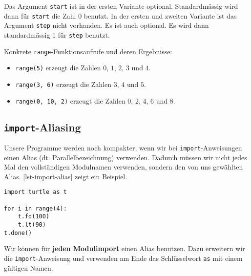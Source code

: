\vspace{-0.25cm}

\begin{important}
Das Argument \lstinline{start} ist in der ersten Variante optional. Standardmässig wird dann für \lstinline{start} die Zahl \num{0} benutzt. In der ersten und zweiten Variante ist das Argument \lstinline{step} nicht vorhanden. Es ist auch optional. Es wird dann standardmässig \num{1} für \lstinline{step} benutzt.
\end{important}

\begin{example}
Konkrete \texttt{range}-Funktionsaufrufe und deren Ergebnisse:
\begin{itemize}
\item \lstinline{range(5)} erzeugt die Zahlen $0$, $1$, $2$, $3$ und $4$.
\item \lstinline{range(3, 6)} erzeugt die Zahlen $3$, $4$ und $5$.
\item \lstinline{range(0, 10, 2)} erzeugt die Zahlen $0$, $2$, $4$, $6$ und $8$.
\end{itemize}

\end{example}

\vspace{-0.25cm}

\subsection{\lstinline{import}-Aliasing}

Unsere Programme werden noch kompakter, wenn wir bei \lstinline{import}-Anweisungen einen Alias (dt. Parallelbezeichnung) verwenden. Dadurch müssen wir nicht jedes Mal den vollständigen Modulnamen verwenden, sondern den von uns gewählten Alias. \autoref{lst-import-alias} zeigt ein Beispiel.

\begin{lstlisting}[caption={Das Turtle-Modul erhält in Zeile $1$ die Bezeichnung \lstinline{t}. Danach können wir die Befehle aus diesem Modul nur noch mit dieser Bezeichnung verwenden (\graybgtexttt{quadrat\_alias.py}).}, label={lst-import-alias}]
import turtle as t

for i in range(4):
    t.fd(100)
    t.lt(90)
t.done()
\end{lstlisting}

Wir können für \textbf{jeden Modulimport} einen Alias benutzen. Dazu erweitern wir die \lstinline{import}-Anweisung und verwenden am Ende das Schlüsselwort \lstinline{as} mit einem gültigen Namen.

